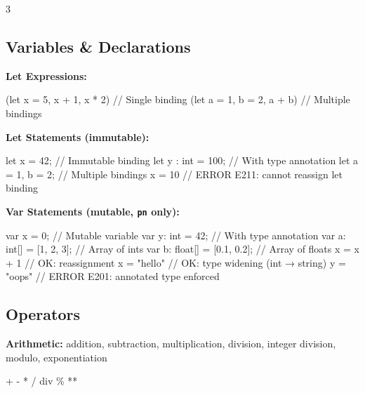 \documentclass[8pt,landscape,a4paper,oneside]{article}
\newenvironment{Shaded}{%
  \begin{snugshade}%
  \vspace{0.4\baselineskip}%
  \fontsize{9}{10}\selectfont%
  \setlength{\parskip}{0pt}%
  \setlength{\topsep}{0pt}%
  \setlength{\partopsep}{0pt}%
}{%
  \vspace{0.01\baselineskip}%
  \end{snugshade}%
}
\newcommand{\NormalTok}[1]{#1}
\begin{document}
\begin{multicols*}{3}
\subsection{Variables \& Declarations}\label{variables-declarations}

\textbf{Let Expressions:}

\begin{Shaded}
\begin{Highlighting}[]
\NormalTok{(let x = 5, x + 1, x * 2)      // Single binding}
\NormalTok{(let a = 1, b = 2, a + b)      // Multiple bindings}
\end{Highlighting}
\end{Shaded}

\textbf{Let Statements (immutable):}

\begin{Shaded}
\begin{Highlighting}[]
\NormalTok{let x = 42;               // Immutable binding}
\NormalTok{let y : int = 100;        // With type annotation}
\NormalTok{let a = 1, b = 2;         // Multiple bindings}
\NormalTok{x = 10     // ERROR E211: cannot reassign let binding}
\end{Highlighting}
\end{Shaded}

\textbf{Var Statements (mutable, \texttt{pn} only):}

\begin{Shaded}
\begin{Highlighting}[]
\NormalTok{var x = 0;         // Mutable variable}
\NormalTok{var y: int = 42;   // With type annotation}
\NormalTok{var a: int[] = [1, 2, 3];  // Array of ints}
\NormalTok{var b: float[] = [0.1, 0.2]; // Array of floats}
\NormalTok{x = x + 1          // OK: reassignment}
\NormalTok{x = "hello"        // OK: type widening (int → string)}
\NormalTok{y = "oops"      // ERROR E201: annotated type enforced}
\end{Highlighting}
\end{Shaded}

\subsection{Operators}\label{operators}

\textbf{Arithmetic:} addition, subtraction, multiplication, division,
integer division, modulo, exponentiation

\begin{Shaded}
\begin{Highlighting}[]
\NormalTok{+  {-}  *  /  div  \%  **}
\end{Highlighting}
\end{Shaded}


\end{multicols*}
\end{document}
